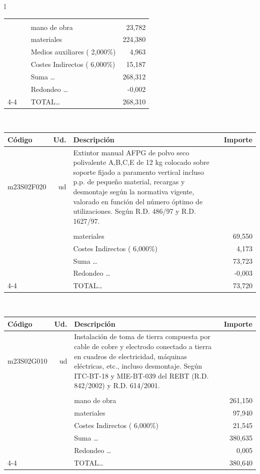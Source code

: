 \documentclass{book}%
\begin{document}
\begin{longtable}{l}
\begin{tabular}{l r p{60mm} r}
&&&\\%
&&mano de obra&    23,782\\%
&&materiales&   224,380\\%
&&Medios auxiliares (     2,000\%)&     4,963\\%
&&Costes Indirectos (     6,000\%)&    15,187\\%
&&Suma \ldots&   268,312\\%
&&Redondeo \ldots&    {-}0,002\\%
\cline{4-4}%
&&TOTAL\ldots&   268,310\\%
\end{tabular}\\%
\begin{tabular}{l r p{60mm} r}%
Código&Ud.&Descripción&Importe\\%
\hline%
m23S02F020&ud&Extintor manual AFPG de polvo seco polivalente A,B,C,E de 12 kg colocado sobre soporte fijado a paramento vertical incluso p.p. de pequeño material, recargas y desmontaje según la normativa vigente, valorado en función del número óptimo de utilizaciones. Según R.D. 486/97 y R.D. 1627/97.&\\%
&&&\\%
&&materiales&    69,550\\%
&&Costes Indirectos (     6,000\%)&     4,173\\%
&&Suma \ldots&    73,723\\%
&&Redondeo \ldots&    {-}0,003\\%
\cline{4-4}%
&&TOTAL\ldots&    73,720\\%
\end{tabular}\\%
\begin{tabular}{l r p{60mm} r}%
Código&Ud.&Descripción&Importe\\%
\hline%
m23S02G010&ud&Instalación de toma de tierra compuesta por cable de cobre y electrodo conectado a tierra en cuadros de electricidad, máquinas eléctricas, etc., incluso desmontaje. Según ITC{-}BT{-}18 y MIE{-}BT{-}039 del REBT (R.D. 842/2002) y R.D. 614/2001.&\\%
&&&\\%
&&mano de obra&   261,150\\%
&&materiales&    97,940\\%
&&Costes Indirectos (     6,000\%)&    21,545\\%
&&Suma \ldots&   380,635\\%
&&Redondeo \ldots&     0,005\\%
\cline{4-4}%
&&TOTAL\ldots&   380,640\\%

\end{tabular}
\end{longtable}
\end{document}
